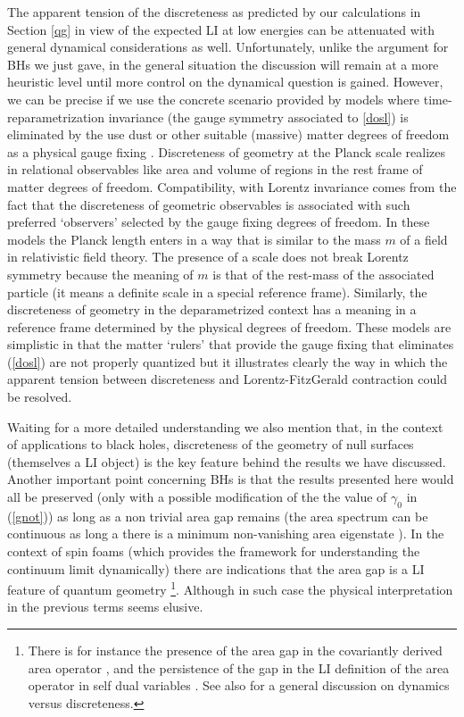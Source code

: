 \documentclass[aps, nofootinbib,superscriptaddress,12pt]{revtex4-2}
\begin{document}
The apparent tension of the discreteness as predicted by our calculations in Section \ref{qg} in view of the expected LI at low energies 
can be attenuated with general dynamical considerations as well. Unfortunately, unlike the argument for BHs we just gave, in the general situation the discussion will remain at a more heuristic level until more control on the dynamical question is gained. However, we can be precise if we use the concrete scenario provided by models where time-reparametrization invariance (the gauge symmetry associated to \eqref{dosl}) is eliminated by the use dust or other suitable (massive) matter degrees of freedom as a physical gauge fixing \cite{Brown:1994py, Giesel:2007wn, Domagala:2010bm, Giesel:2012rb}.  Discreteness of geometry at the Planck scale realizes in relational observables \cite{Rovelli:1990ph, Rovelli:2001bz} like area and volume of regions in the rest frame of matter degrees of freedom. Compatibility, with Lorentz invariance comes from the fact that the discreteness of geometric observables is associated with such preferred `observers' selected by the gauge fixing  degrees of freedom.
In these models the Planck length enters in a way that is similar to the mass $m$ of a field in relativistic field theory. The presence of a scale does not break Lorentz symmetry because the meaning of $m$ is that of the rest-mass of the associated particle (it means a definite scale in a special reference frame). Similarly, the discreteness of geometry in the deparametrized context has a meaning in a reference frame determined by the physical degrees of freedom. 
These models are simplistic in that the matter `rulers' that provide the gauge fixing that eliminates (\eqref{dosl}) are not properly quantized but it illustrates clearly the way in which the apparent tension between discreteness and Lorentz-FitzGerald contraction could be resolved.


Waiting for a more detailed understanding we also mention that, in the context of applications to black holes, discreteness of the geometry of null surfaces (themselves a LI object) is the key feature behind the results we have discussed. Another important point concerning BHs is that the results presented here would  all be preserved (only with a possible modification of the the value of $\gamma_0$ in (\ref{gnot})) as long as a non trivial area gap remains (the area spectrum can be continuous as long a there is a minimum non-vanishing area eigenstate \cite{Ghosh:2013iwa, Frodden:2012dq}). In the context of spin foams \cite{Rovelli:2010ed} (which provides the framework for understanding the continuum limit dynamically) there are indications that the area gap is a LI feature of quantum geometry \footnote{There is for instance the presence of the area gap in the covariantly derived area operator \cite{Alexandrov:2002br}, and the persistence of the gap in the LI definition of the area operator in self dual variables \cite{Frodden:2012dq}.
See also \cite{Dittrich:2007th} for a general discussion on dynamics versus discreteness.}. Although in such case the physical interpretation in the previous terms seems elusive.
\end{document}
